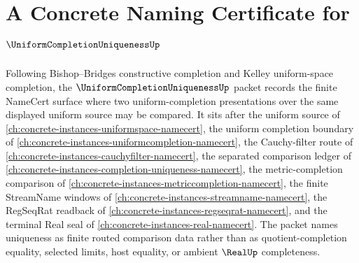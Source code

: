 \chapter{A Concrete Naming Certificate for $\UniformCompletionUniquenessUp$}
\label{ch:concrete-instances-uniform-completion-uniqueness-namecert}

Following Bishop--Bridges constructive completion and Kelley uniform-space completion, the $\UniformCompletionUniquenessUp$ packet records the finite NameCert surface where two uniform-completion presentations over the same displayed uniform source may be compared. It sits after the uniform source of \autoref{ch:concrete-instances-uniformspace-namecert}, the uniform completion boundary of \autoref{ch:concrete-instances-uniformcompletion-namecert}, the Cauchy-filter route of \autoref{ch:concrete-instances-cauchyfilter-namecert}, the separated comparison ledger of \autoref{ch:concrete-instances-completion-uniqueness-namecert}, the metric-completion comparison of \autoref{ch:concrete-instances-metriccompletion-namecert}, the finite StreamName windows of \autoref{ch:concrete-instances-streamname-namecert}, the RegSeqRat readback of \autoref{ch:concrete-instances-regseqrat-namecert}, and the terminal Real seal of \autoref{ch:concrete-instances-real-namecert}. The packet names uniqueness as finite routed comparison data rather than as quotient-completion equality, selected limits, host equality, or ambient $\RealUp$ completeness.

